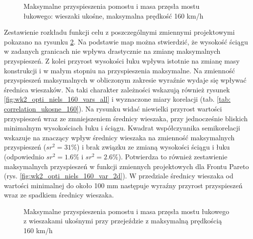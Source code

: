 \begin{figure}[hbt!]
	\centering
	\captionsetup{justification=centering}
	\caption{Maksymalne przyspieszenia pomostu i masa przęsła mostu łukowego: wieszaki ukośne, maksymalna prędkość 160 km/h}
	\label{fig:wk2_opti_niels_160_all}
\end{figure}

Zestawienie rozkładu funkcji celu z poszczególnymi zmiennymi projektowymi pokazano na rysunku \ref{fig:wk2_opti_niels_160_variables}. Na podstawie map można stwierdzić, że wysokość ściągu w zadanych granicach nie wpływa drastycznie na zmianę maksymalnych przyspieszeń. Z kolei przyrost wysokości łuku wpływa istotnie na zmianę masy konstrukcji i w małym stopniu na przyspieszenia maksymalne. Na zmienność przyspieszeń maksymalnych w obliczonym zakresie wyraźnie wydaje się wpływać średnica wieszaków. Na taki charakter zależności wskazują również rysunek \ref{fig:wk2_opti_niels_160_vars_all} i wyznaczone miary korelacji (tab. \ref{tab: correlation_ukosne_160}). Na rysunku widać niewielki przyrost wartości przyspieszeń wraz ze zmniejszeniem średnicy wieszaka, przy jednocześnie bliskich minimalnym wysokościach łuku i ściągu. Kwadrat współczynnika semikorelacji wskazuje na znaczący wpływ średnicy wieszaka na zmienność maksymalnych przyspieszeń ($sr^2=31\%$) i brak związku ze zmianą wysokości ściągu i łuku (odpowiednio $sr^2 = 1.6\%$ i $sr^2=2.6 \%$). Potwierdza to również zestawienie maksymalnych przyspieszeń w funkcji zmiennych projektowych dla Frontu Pareto (rys. \ref{fig:wk2_opti_niels_160_var_2d}). W przedziale średnicy wieszaka od wartości minimalnej do około 100 mm następuje wyraźny przyrost przyspieszeń wraz ze spadkiem średnicy wieszaka.

\clearpage


\begin{figure}[hbt!]
	\centering
	\captionsetup{justification=centering}
	\caption{Maksymalne przyspieszenia pomostu i masa przęsła mostu łukowego z wieszakami ukośnymi przy przejeździe z maksymalną prędkością 160 km/h}
	\label{fig:wk2_opti_niels_160_variables}
\end{figure}

